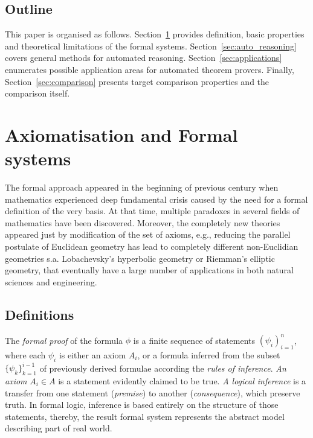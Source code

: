\documentclass[article]{aaltoseries}
\begin{document}

\subsection{Outline}
This paper is organised as follows.
Section~\ref{sec:formal_theory} provides definition, basic properties and theoretical limitations of the formal systems. Section~\ref{sec:auto_reasoning} covers general methods for automated reasoning. Section~\ref{sec:applications} enumerates possible application areas for automated theorem provers. Finally, Section~\ref{sec:comparison} presents target comparison properties and the comparison itself.


\section{Axiomatisation and Formal systems}
\label{sec:formal_theory}

The formal approach appeared in the beginning of previous century when mathematics experienced deep fundamental crisis caused by the need for a formal definition of the very basis. At that time, multiple paradoxes in several fields of mathematics have been discovered. Moreover, the completely new theories appeared just by modification of the set of axioms, e.g., reducing the parallel postulate of Euclidean geometry has lead to completely different non-Euclidian geometries s.a. Lobachevsky's hyperbolic geometry or Riemman's elliptic geometry, that eventually have a large number of applications in both natural sciences and engineering.

\subsection{Definitions}
\label{sec:definitions}


The \textit{formal proof} of the formula $\phi$ is a finite sequence of statements $ ( \psi_i )_{i=1}^{n} $, where each $\psi_i$ is either an axiom $A_i$, or a formula inferred from the subset $\{ \psi_k \}_{k=1}^{i-1}$ of previously derived formulae according the \textit{rules of inference}. \textit{An axiom} $A_i \in A$ is a statement evidently claimed to be true. \textit{A logical inference} is a transfer from one statement (\textit{premise}) to another (\textit{consequence}), which preserve truth. In formal logic, inference is based entirely on the structure of those statements, thereby, the result formal system represents the abstract model describing part of real world.
\end{document}

